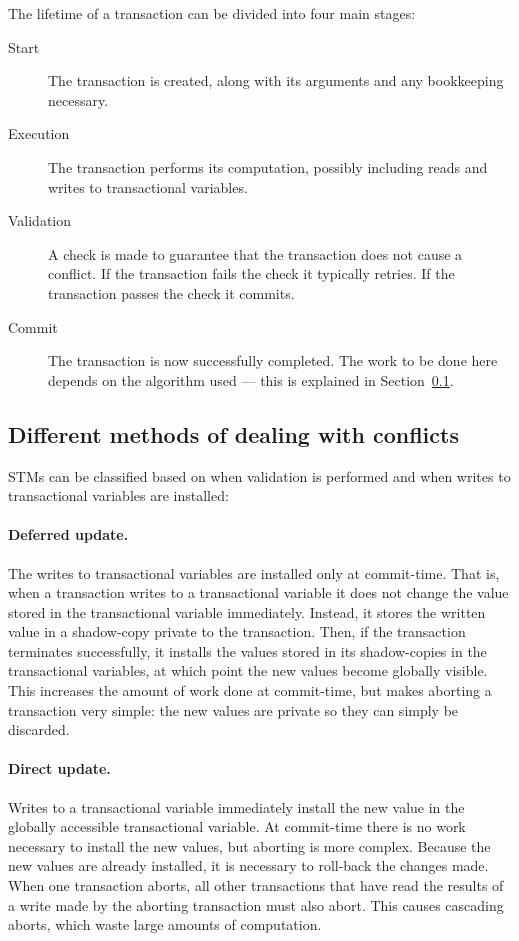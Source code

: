 \documentclass[12pt,a4paper,oneside,openright]{report}
\begin{document}
The lifetime of a transaction can be divided into four main stages:

\begin{description}
\item[Start] The transaction is created, along with its arguments and
  any bookkeeping necessary.
\item[Execution] The transaction performs its computation, possibly
  including reads and writes to transactional variables.
\item[Validation] A check is made to guarantee that the transaction
  does not cause a conflict. If the transaction fails the check it
  typically retries. If the transaction passes the check it commits.
\item[Commit] The transaction is now successfully completed. The work
  to be done here depends on the algorithm used --- this is explained
  in Section~\ref{sec:impl:diff-meth-deal}.
\end{description}

\subsection{Different methods of dealing with conflicts}
\label{sec:impl:diff-meth-deal}

STMs can be classified based on when validation is performed and when
writes to transactional variables are installed:

\paragraph{Deferred update.} The writes to transactional variables are
installed only at commit-time. That is, when a transaction writes to a
transactional variable it does not change the value stored in the
transactional variable immediately. Instead, it stores the written
value in a shadow-copy private to the transaction. Then, if the
transaction terminates successfully, it installs the values stored in
its shadow-copies in the transactional variables, at which point the
new values become globally visible. This increases the amount of work
done at commit-time, but makes aborting a transaction very simple: the
new values are private so they can simply be discarded.

\paragraph{Direct update.} Writes to a transactional variable
immediately install the new value in the globally accessible
transactional variable. At commit-time there is no work necessary to
install the new values, but aborting is more complex. Because the new
values are already installed, it is necessary to roll-back the changes
made. When one transaction aborts, all other transactions that have
read the results of a write made by the aborting transaction must also
abort. This causes cascading aborts, which waste large amounts of
computation.
\end{document}
